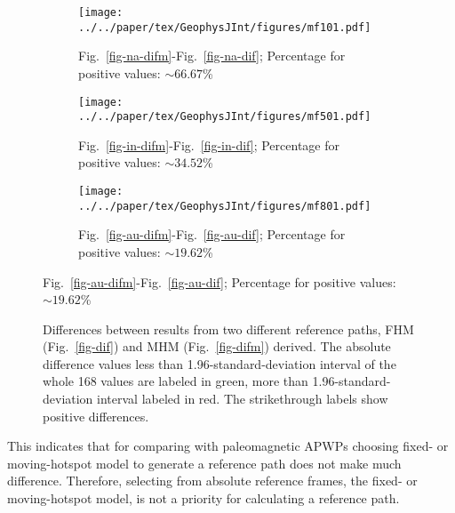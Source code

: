 \begin{figure}[tbp]
  \captionsetup[subfigure]{aboveskip=2pt,belowskip=-3pt}
  \centering
  \begin{subfigure}{1\textwidth}
    \texttt{[image: ../../paper/tex/GeophysJInt/figures/mf101.pdf]}
    \caption{Fig.~\ref{fig-na-difm}-Fig.~\ref{fig-na-dif}; Percentage for
      positive values: ${\sim}66.67$\%}\label{fig-mf101}
  \end{subfigure}
  \vspace{.1em}
  \begin{subfigure}{1\textwidth}
    \texttt{[image: ../../paper/tex/GeophysJInt/figures/mf501.pdf]}
    \caption{Fig.~\ref{fig-in-difm}-Fig.~\ref{fig-in-dif}; Percentage for
      positive values: ${\sim}34.52$\%}\label{fig-mf501}
  \end{subfigure}
  \vspace{.1em}
  \begin{subfigure}{1\textwidth}
    \texttt{[image: ../../paper/tex/GeophysJInt/figures/mf801.pdf]}
    \caption{Fig.~\ref{fig-au-difm}-Fig.~\ref{fig-au-dif}; Percentage for
      positive values: ${\sim}19.62$\%}\label{fig-mf801}
  \end{subfigure}
\end{figure}
\begin{figure}[!ht]
  \ContinuedFloat\caption[Differences between results from FHM and MHM]{Differences between
    results from two different reference paths, FHM (Fig.~\ref{fig-dif}) and MHM
    (Fig.~\ref{fig-difm}) derived. The absolute difference values less than
    1.96-standard-deviation interval of the whole 168 values are labeled in
    green, more than 1.96-standard-deviation interval labeled in red. The
    strikethrough labels show positive differences.}\label{fig-dmf}
\end{figure}

This indicates that for comparing with paleomagnetic APWPs choosing fixed- or
moving-hotspot model to generate a reference path does not make much difference.
Therefore, selecting from absolute reference frames, the fixed- or
moving-hotspot model, is not a priority for calculating a reference path.


